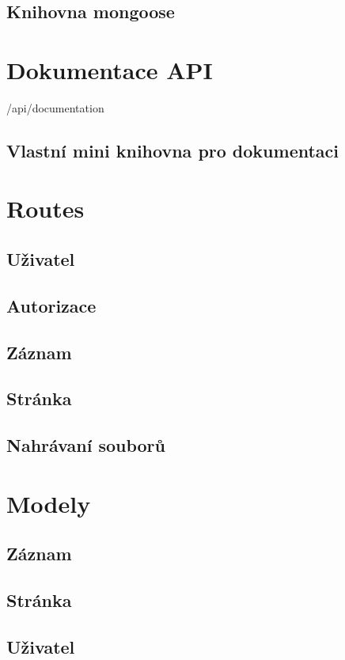 \subsection{Knihovna mongoose}


\section{Dokumentace API}
/api/documentation
\subsection{Vlastní mini knihovna pro dokumentaci}

\section{Routes}
\subsection{Uživatel}
\subsection{Autorizace}
\subsection{Záznam}
\subsection{Stránka}
\subsection{Nahrávaní souborů}

\section{Modely}
\subsection{Záznam}
\subsection{Stránka}
\subsection{Uživatel}
